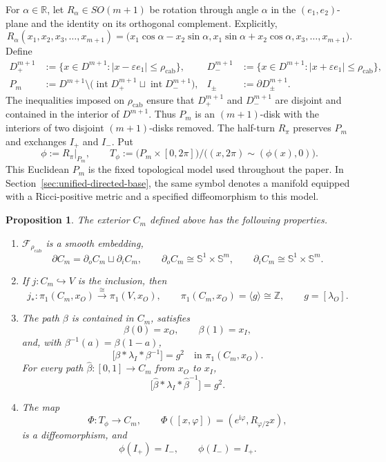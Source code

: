 \documentclass[11pt,reqno]{amsart}
\newtheorem{proposition}[theorem]{Proposition}
\theoremstyle{definition}
\numberwithin{equation}{section}
\newcommand{\rhoCab}{{\rho_{\mathrm{cab}}}}
\begin{document}
For $\alpha\in\mathbb R$, let $R_\alpha\in SO(m+1)$ be rotation through
angle $\alpha$ in the $(e_1,e_2)$-plane and the identity on its
orthogonal complement.  Explicitly,
\[
 R_\alpha(x_1,x_2,x_3,\ldots,x_{m+1})
 =\bigl(x_1\cos\alpha-x_2\sin\alpha,
        x_1\sin\alpha+x_2\cos\alpha,
        x_3,\ldots,x_{m+1}\bigr).
\]
Define
\begin{align*}
 D^{m+1}_+&:=\{x\in D^{m+1}:|x-\varepsilon e_1|\le\rhoCab\},
 &D^{m+1}_-&:=\{x\in D^{m+1}:|x+\varepsilon e_1|\le\rhoCab\},\\
 P_m&:=D^{m+1}\setminus
 \bigl(\operatorname{int}D^{m+1}_+
       \sqcup\operatorname{int}D^{m+1}_-\bigr),
 &I_\pm&:=\partial D^{m+1}_\pm.
\end{align*}
The inequalities imposed on $\rhoCab$ ensure that $D^{m+1}_+$ and
$D^{m+1}_-$ are disjoint and contained in the interior of $D^{m+1}$.
Thus $P_m$ is an $(m+1)$-disk with the interiors of two disjoint
$(m+1)$-disks removed.  The half-turn $R_\pi$ preserves $P_m$ and
exchanges $I_+$ and $I_-$.  Put
\[
 \phi:=R_\pi|_{P_m},
 \qquad
 T_\phi:=\bigl(P_m\times[0,2\pi]\bigr)/
       \bigl((x,2\pi)\sim(\phi(x),0)\bigr).
\]
This Euclidean $P_m$ is the fixed topological model used throughout the
paper.  In Section~\ref{sec:unified-directed-base}, the same symbol
denotes a manifold equipped with a Ricci-positive metric and a specified
diffeomorphism to this model.

\begin{proposition}
\label{prop:double-cable}
The exterior $C_m$ defined above has the following properties.
\begin{enumerate}[label=\textup{(\roman*)}]
\item $\mathcal F_{\rhoCab}$ is a smooth embedding,
\[
 \partial C_m=\partial_oC_m\sqcup\partial_iC_m,
 \qquad
 \partial_oC_m\cong\mathbb S^1\times\mathbb S^m,
 \qquad
 \partial_iC_m\cong\mathbb S^1\times\mathbb S^m.
\]
\item If $j:C_m\hookrightarrow V$ is the inclusion, then
\[
 j_*:\pi_1(C_m,x_O)\xrightarrow{\ \cong\ }\pi_1(V,x_O),
 \qquad
 \pi_1(C_m,x_O)=\langle g\rangle\cong\mathbb Z,
 \qquad
 g=[\lambda_O].
\]
\item The path $\beta$ is contained in $C_m$, satisfies
\[
 \beta(0)=x_O,
 \qquad
 \beta(1)=x_I,
\]
and, with $\beta^{-1}(a)=\beta(1-a)$,
\[
 \bigl[\beta*\lambda_I*\beta^{-1}\bigr]=g^2
 \quad\text{in }\pi_1(C_m,x_O).
\]
For every path $\widehat\beta:[0,1]\to C_m$ from $x_O$ to $x_I$,
\[
 \bigl[\widehat\beta*\lambda_I*\widehat\beta^{-1}\bigr]=g^2.
\]
\item The map
\[
 \Phi:T_\phi\longrightarrow C_m,
 \qquad
 \Phi([x,\varphi])=(e^{\mathrm i\varphi},R_{\varphi/2}x),
\]
is a diffeomorphism, and
\[
 \phi(I_+)=I_-,
 \qquad
 \phi(I_-)=I_+.
\]
\end{enumerate}
\end{proposition}
\end{document}
